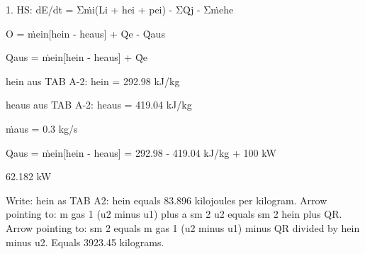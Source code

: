 1. HS: dE/dt = Σṁi(Li + hei + pei) - ΣQ̇j - Σṁehe

O = ṁein[hein - heaus] + Q̇e - Q̇aus

Qaus = ṁein[hein - heaus] + Q̇e

hein aus TAB A-2: hein = 292.98 kJ/kg

heaus aus TAB A-2: heaus = 419.04 kJ/kg

ṁaus = 0.3 kg/s

Qaus = ṁein[hein - heaus] = 292.98 - 419.04 kJ/kg + 100 kW

62.182 kW

Write: hein as TAB A2: hein equals 83.896 kilojoules per kilogram.  
Arrow pointing to: m gas 1 (u2 minus u1) plus a sm 2 u2 equals sm 2 hein plus QR.  
Arrow pointing to: sm 2 equals m gas 1 (u2 minus u1) minus QR divided by hein minus u2.  
Equals 3923.45 kilograms.